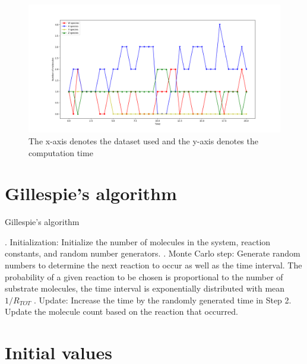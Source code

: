 \documentclass[11pt,a4paper]{article}
\begin{document}
\begin{figure}[!h]
\centering
\includegraphics[width=1\textwidth]{Images/Figure_1.png}
\caption{The x-axis denotes the dataset used and the y-axis denotes the computation time}
\label{fig:barplot random 50}
\end{figure}

\section{Gillespie's algorithm}
    \begin{algorithm}[!h]                     %
    \caption{Gillespie's algorithm}           %
    \begin{algorithmic}                       %

    \REQUIRE
    \ENSURE

    . Initialization: Initialize the number of molecules in the system, reaction constants, and random number generators.
    . Monte Carlo step: Generate random numbers to determine the next reaction to occur as well as the time interval. The probability of a given reaction to be chosen is proportional to the number of substrate molecules, the time interval is exponentially distributed with mean $1/R_{TOT}$
    . Update: Increase the time by the randomly generated time in Step 2. Update the molecule count based on the reaction that occurred.

    \ENDWHILE
    \end{algorithmic}
    \end{algorithm}

\section{Initial values}
\end{document}
